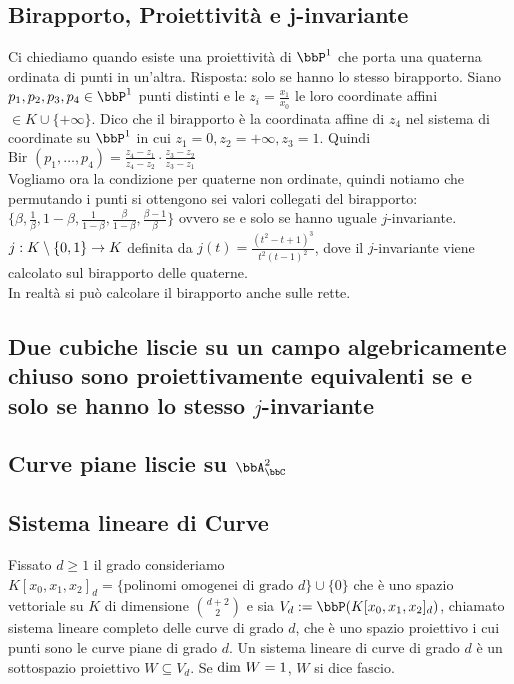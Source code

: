 \documentclass[a4paper,NoNotes,GeneralMath]{stdmdoc}
\begin{document}
	\subsection*{Birapporto, Proiettività e j-invariante}
	Ci chiediamo quando esiste una proiettività di $\bbP^1$ che porta una quaterna ordinata di punti in un'altra. Risposta: solo se hanno lo stesso birapporto. Siano $p_1, p_2, p_3, p_4 \in \bbP^1$ punti distinti e le $z_i = \frac{x_1}{x_0}$ le loro coordinate affini $\in K \cup \{ +\infty \}$. Dico che il birapporto è la coordinata affine di $z_4$ nel sistema di coordinate su $\bbP^1$ in cui $z_1 = 0, z_2 = +\infty, z_3 = 1$. Quindi $\text{Bir }(p_1, \ldots, p_4) = \frac{z_4 - z_1}{z_4 - z_2} \cdot \frac{z_3 - z_2}{z_3 - z_1}$ \\
	Vogliamo ora la condizione per quaterne non ordinate, quindi notiamo che permutando i punti si ottengono sei valori collegati del birapporto: $\{ \beta, \frac{1}{\beta}, 1-\beta , \frac{1}{1-\beta}, \frac{\beta}{1-\beta}, \frac{\beta - 1}{\beta} \}$ ovvero se e solo se hanno uguale $j$-invariante. $j: K \setminus \{0, 1\} \rightarrow K$ definita da $j(t) = \frac{(t^2 - t + 1)^3}{t^2 (t-1)^2}$, dove il $j$-invariante viene calcolato sul birapporto delle quaterne. \\
	In realtà si può calcolare il birapporto anche sulle rette.
	
	\subsection*{Due cubiche liscie su un campo algebricamente chiuso sono proiettivamente equivalenti se e solo se hanno lo stesso $j$-invariante}
	
	\subsection*{Curve piane liscie su $\bbA^2_\bbC$}
	
	\subsection*{Sistema lineare di Curve}
	Fissato $d \ge 1$ il grado consideriamo $K[x_0, x_1, x_2]_d = \{ \text{polinomi omogenei di grado } d \} \cup \{ 0 \}$ che è uno spazio vettoriale su $K$ di dimensione $\binom{d+2}{2}$ e sia $V_d := \bbP ( K[x_0,x_1,x_2]_d )$, chiamato sistema lineare completo delle curve di grado $d$, che è uno spazio proiettivo i cui punti sono le curve piane di grado $d$. Un sistema lineare di curve di grado $d$ è un sottospazio proiettivo $W \subseteq V_d$. Se $\mbox{dim } W = 1$, $W$ si dice fascio.
	
\end{document}
